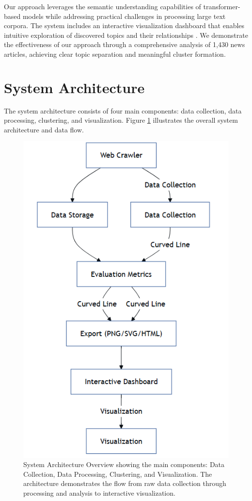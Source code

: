 \documentclass[conference]{IEEEtran}
\begin{document}
Our approach leverages the semantic understanding capabilities of transformer-based models while addressing practical challenges in processing large text corpora. The system includes an interactive visualization dashboard that enables intuitive exploration of discovered topics and their relationships \citep{plotly2015}. We demonstrate the effectiveness of our approach through a comprehensive analysis of 1,430 news articles, achieving clear topic separation and meaningful cluster formation.

\section{System Architecture}
The system architecture consists of four main components: data collection, data processing, clustering, and visualization. Figure \ref{fig:architecture} illustrates the overall system architecture and data flow.

\begin{figure}[!t]
\centering
\includegraphics[width=\columnwidth]{images/architecture.png}
\caption{System Architecture Overview showing the main components: Data Collection, Data Processing, Clustering, and Visualization. The architecture demonstrates the flow from raw data collection through processing and analysis to interactive visualization.}
\label{fig:architecture}
\end{figure}
\end{document}
